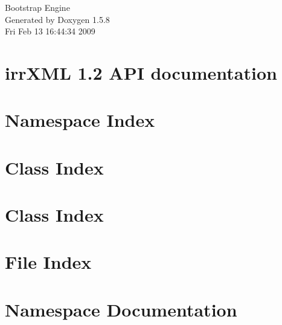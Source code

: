 \documentclass[a4paper]{book}
\begin{document}
\begin{titlepage}
\vspace*{7cm}
\begin{center}
{\Large Bootstrap Engine }\\
\vspace*{1cm}
{\large Generated by Doxygen 1.5.8}\\
\vspace*{0.5cm}
{\small Fri Feb 13 16:44:34 2009}\\
\end{center}
\end{titlepage}
\clearemptydoublepage
{}
\tableofcontents
\clearemptydoublepage
{}
\chapter{irrXML 1.2 API documentation}
\label{index}\hypertarget{index}{}
\chapter{Namespace Index}

\chapter{Class Index}

\chapter{Class Index}

\chapter{File Index}

\chapter{Namespace Documentation}



\end{document}
